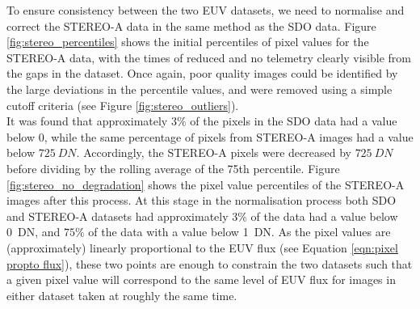 \documentclass[11pt,a4paper,onecolumn]{report}
\begin{document}
To ensure consistency between the two EUV datasets, we need to normalise and
correct the STEREO-A data in the same method as the SDO data. Figure
\ref{fig:stereo_percentiles} shows the initial percentiles of pixel values for
the STEREO-A data, with the times of reduced and no telemetry clearly visible
from the gaps in the dataset. Once again, poor quality images could be
identified by the large deviations in the percentile values, and were removed
using a simple cutoff criteria (see Figure \ref{fig:stereo_outliers}).\\

It was found that approximately $3 \%$ of the pixels in the SDO data had a value
below 0, while the same percentage of pixels from STEREO-A images had a value
below $\SI[]{725}[]{DN}$. Accordingly, the STEREO-A pixels were decreased by
$\SI[]{725}[]{DN}$ before dividing by the rolling average of the 75th
percentile. Figure \ref{fig:stereo_no_degradation} shows the pixel value
percentiles of the STEREO-A images after this process. At this stage in the
normalisation process both SDO and STEREO-A datasets had approximately $3 \%$ of
the data had a value below \SI{0}{DN}, and $75 \%$ of the data with a value
below \SI{1}{DN}. As the pixel values are (approximately) linearly proportional
to the EUV flux (see Equation \ref{eqn:pixel propto flux}), these two points are
enough to constrain the two datasets such that a given pixel value will
correspond to the same level of EUV flux for images in either dataset taken
at roughly the same time. \\
\end{document}
